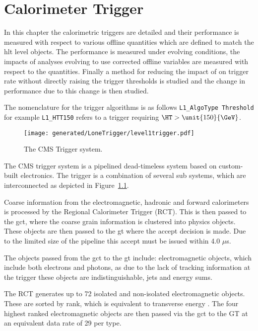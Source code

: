 \chapter{\Lone Calorimeter Trigger} %
\label{cha:level_one_trigger}
In this chapter the \Lone calorimetric triggers are detailed and their performance is measured with respect to various offline quantities which are defined to match the \ac{hlt} level objects. The performance is measured under evolving \pu conditions, the impacts of analyses evolving to use \pu corrected offline variables are measured with respect to the \Lone quantities. Finally a method for reducing the impact of \pu on \Lone trigger rate without directly raising the trigger thresholds is studied and the change in performance due to this change is then studied.

The nomenclature for the \Lone trigger algorithms is as follows \verb|L1_AlgoType Threshold| for example \verb|L1_HTT150| refers to a \Lone trigger requiring $\HT > \unit{150}{\GeV}$.

\begin{figure}[ht]
  \centering
    \texttt{[image: generated/LoneTrigger/level1trigger.pdf]}
  \caption{The CMS \Lone Trigger system.}
  \label{fig:figures_LoneTrigger_level1trigger}
\end{figure}

The CMS \Lone trigger system is a pipelined dead-timeless system based 
on custom-built electronics.
The \Lone trigger is a combination of several sub systems, which are 
interconnected as depicted in 
Figure~\ref{fig:figures_LoneTrigger_level1trigger}.

Coarse information from the electromagnetic, hadronic and forward 
calorimeters is processed by the Regional Calorimeter Trigger (RCT). This is 
then passed to the \ac{gct}, where the coarse grain 
information is clustered into physics objects. These objects are then passed 
to the \ac{gt} where the \Lone accept decision is made. Due to the 
limited size of the pipeline this \Lone accept must be issued within 4.0 
$\mu$s.

The objects passed from the \ac{gct} to the \ac{gt} include: electromagnetic objects, which include both electrons and photons, as due to the lack of tracking information at the \Lone trigger these objects are indistinguishable, jets and energy sums.

The RCT generates up to 72 isolated and non-isolated electromagnetic objects. 
These are sorted by rank, which is equivalent to transverse energy \ET. The 
four highest ranked electromagnetic objects are then passed via the \ac{gct} to the 
GT at an equivalent data rate of 29 \Gbs per type.

